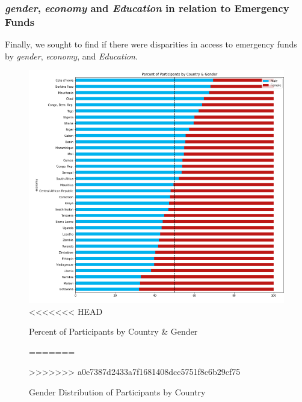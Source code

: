 \documentclass[water,article,submit,moreauthors,pdftex]{mdpi}
\begin{document}
\hypertarget{gender-economy-and-education-in-relation-to-emergency-funds}{%
\subsubsection{\texorpdfstring{\emph{gender}, \emph{economy} and
\emph{Education} in relation to Emergency
Funds}{gender, economy and Education in relation to Emergency Funds}}\label{gender-economy-and-education-in-relation-to-emergency-funds}}

Finally, we sought to find if there were disparities in access to
emergency funds by \emph{gender}, \emph{economy}, and \emph{Education}.

\begin{figure}
\centering
\includegraphics[width=\textwidth,height=0.5\textheight]{images/percent_participants_by_country_gender.png}
<<<<<<< HEAD
\caption{Percent of Participants by Country \& Gender}
=======
\caption{Gender Distribution of Participants by Country}
>>>>>>> a0e7387d2433a7f1681408dcc5751f8c6b29cf75
\end{figure}
\end{document}
